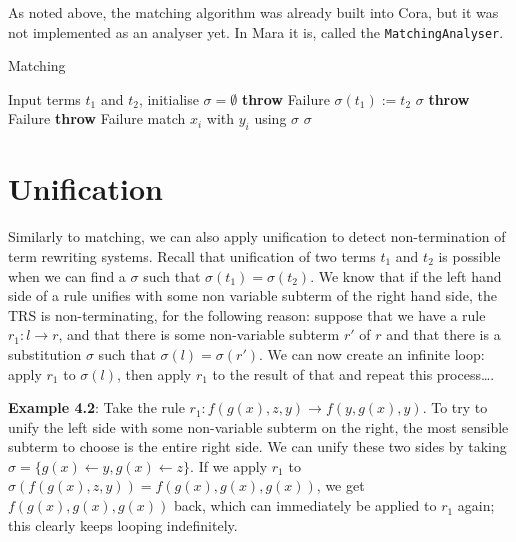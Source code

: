 As noted above, the matching algorithm was already built into Cora, but it was not implemented as an analyser yet. In Mara it is, called the \texttt{MatchingAnalyser}. 

\begin{algorithm}
\caption{Matching}
\label{matching}
\begin{algorithmic}[1]
\STATE Input terms $t_1$ and $t_2$, initialise $\sigma = \emptyset$
      \STATE \textbf{throw} Failure
    \ENDIF
  \ELSE
    \STATE $\sigma(t_1) := t_2$
    \RETURN $\sigma$
  \ENDIF
{}
    \STATE \textbf{throw} Failure
      \STATE \textbf{throw} Failure
    \ENDIF
      \STATE match $x_i$ with $y_i$ using $\sigma$
      \RETURN $\sigma$
    \ENDFOR
  \ENDIF
\ENDIF
\end{algorithmic}
\end{algorithm}

\section{Unification}
Similarly to matching, we can also apply unification to detect non-termination of term rewriting systems. Recall that unification of two terms $t_1$ and $t_2$ is possible when we can find a $\sigma$ such that $\sigma(t_1) = \sigma(t_2)$. We know that if the left hand side of a rule unifies with some non variable subterm of the right hand side, the TRS is non-terminating, for the following reason: suppose that we have a rule $r_1: l \rightarrow r$, and that there is some non-variable subterm $r'$ of $r$ and that there is a substitution $\sigma$ such that $\sigma(l) = \sigma(r')$. We can now create an infinite loop: apply $r_1$ to $\sigma(l)$, then apply $r_1$ to the result of that and repeat this process\dots.

\textbf{Example 4.2}: Take the rule $r_1: f(g(x), z, y) \rightarrow f(y, g(x), y)$. To try to unify the left side with some non-variable subterm on the right, the most sensible subterm to choose is the entire right side. We can unify these two sides by taking $\sigma = \{ g(x) \leftarrow y, g(x) \leftarrow z \}$. If we apply $r_1$ to $\sigma(f(g(x), z, y)) = f(g(x), g(x), g(x))$, we get $f(g(x), g(x), g(x))$ back, which can immediately be applied to $r_1$ again; this clearly keeps looping indefinitely.

